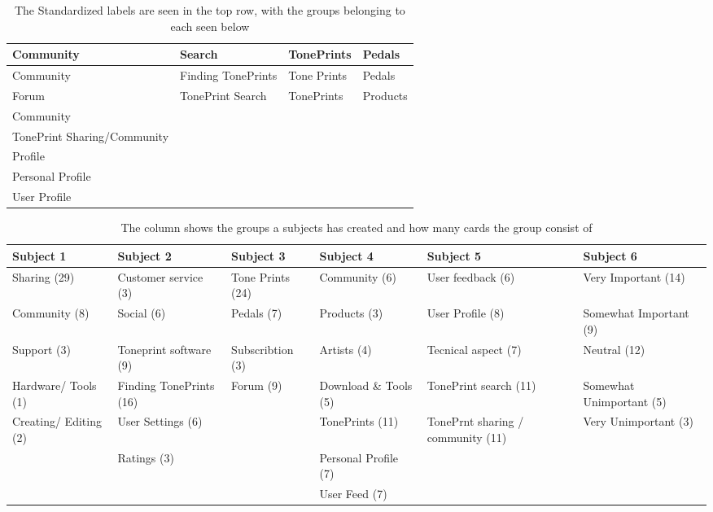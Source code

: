 \begin{table}
\begin{tabular}{|l|l|l|l|}
\hline
Community & Search & TonePrints & Pedals \\ \hline
Community & Finding TonePrints & Tone Prints & Pedals \\
Forum & TonePrint Search & TonePrints & Products \\
Community & & & \\
TonePrint Sharing/Community & & & \\ \hline
Profile & & & \\ \hline
Personal Profile & & & \\
User Profile & & & \\ \hline
\end{tabular}
\caption{The Standardized labels are seen in the top row, with the groups belonging to each seen below}
\label{StandardizedLabels}
\end{table}

\begin{table}[h]
\small
\begin{tabularx}{\textwidth}{|R|R|R|R|R|R|}
\hline
\textbf{Subject 1} & \textbf{Subject 2} & \textbf{Subject 3} & \textbf{Subject 4} & \textbf{Subject 5} & \textbf{Subject 6} \\ \hline
Sharing (29) & Customer service (3) & Tone Prints (24) & Community (6) & User feedback (6) & Very Important (14) \\ \hline
Community (8) & Social (6) & Pedals (7) & Products (3) & User Profile (8) & Somewhat Important (9) \\ \hline
Support (3) & Toneprint software (9) & Subscribtion (3) & Artists (4) & Tecnical aspect (7) & Neutral (12) \\ \hline
Hardware/ Tools (1) & Finding TonePrints (16) & Forum (9) & Download \& Tools (5) & TonePrint search (11) & Somewhat Unimportant (5) \\ \hline
Creating/ Editing (2) & User Settings (6) && TonePrints (11) & TonePrnt sharing / community (11) & Very Unimportant (3) \\ \hline
& Ratings (3) && Personal Profile (7) && \\ \hline
&&& User Feed (7) && \\ \hline
\end{tabularx}
\caption{The column shows the groups a subjects has created and how many cards the group consist of}
\label{Tab:GroupOverview}
\end{table}

